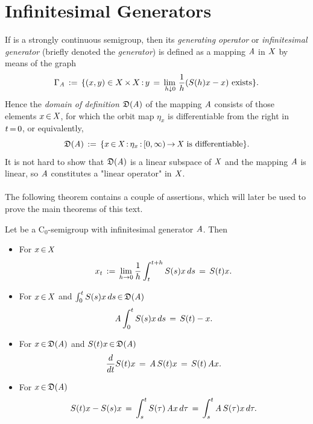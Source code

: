 \documentclass[11pt,twoside]{article}
\begin{document}
\section{Infinitesimal Generators}
If {\SG} is a strongly continuous semigroup,
then its \textit{generating operator} or \textit{infinitesimal generator}
(briefly denoted the \textit{generator})
is defined as a mapping $\mathit{A}$ in $\mathit{X}$ by means of the graph
\[
\Gamma_{\mathit{A}}
\,:=\,
\{(x,y) \in X {\,\times\,} X {\,:\,}
y \,=\, \lim_{\,h \downarrow 0} \, \frac{1}{h}({S}(h)x-x) \mbox{ exists}\}.
\]
Hence the \textit{domain of definition} $\mathfrak{D}(\mathit{A})$ of the mapping $\mathit{A}$
consists of those elements $x {\,\in\,} \mathit{X}$,
for which the orbit map $\eta_x$ is differentiable from the right in $t {\,=\,} 0$,
or equivalently,
\[
\mathfrak{D}(\mathit{A}) \,:=\,
\{x {\,\in\,} \mathit{X} {\,:\,} \eta_x{\,:\,}[0,\infty) {\,\to\,} \mathit{X} \mbox{ is differentiable}\}.
\]
It is not hard to show that
$\mathfrak{D}(\mathit{A})$ is a linear subspace of $\mathit{X}$
and the mapping $\mathit{A}$ is linear,
so $\mathit{A}$ constitutes a "linear operator" in $\mathit{X}$.

\paragraph{} %
The following theorem contains a couple of assertions,
which will later be used to prove the main theorems of this text.

\begin{theorem}\label{XXX}
Let {\SG} be a C$_0$-semigroup with infinitesimal generator $\mathit{A}$.
Then
\begin{itemize}[leftmargin=30pt]

\item[(i)]
For $x {\,\in\,} \mathit{X}$
\begin{equation}\label{XXX_1}
x_t \,:=\, \lim_{h \to 0} \frac{1}{h} \int_t^{t+h} S(s)x \,ds \,=\, S(t)x.
\end{equation}

\item[(ii)]
For $x {\,\in\,} \mathit{X}$ and $\int_0^t S(s)x\,ds {\,\in\,} \mathfrak{D}(\mathit{A})$
\begin{equation}\label{XXX_2}
\mathit{A} \int_0^t S(s)x \, ds \,=\, S(t) - x.
\end{equation}

\item[(iii)]
For $x {\,\in\,} \mathfrak{D}(\mathit{A})$ and $S(t)x {\,\in\,} \mathfrak{D}(\mathit{A})$
\begin{equation}\label{XXX_3}
\frac{d}{dt} S(t) x \,=\, \mathit{A} \,S(t)x \,=\, S(t)\, \mathit{A} x.
\end{equation}

\item[(iv)]
For $x {\,\in\,} \mathfrak{D}(\mathit{A})$
\begin{equation}\label{XXX_4}
S(t)x - S(s)x \,=\,
\int_s^t S(\tau)\,\mathit{A} x\,d\tau \,=\,
\int_s^t \mathit{A}\,S(\tau)x \, d\tau.
\end{equation}
\end{itemize}
\end{theorem}
\end{document}
